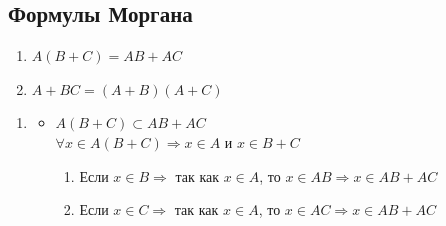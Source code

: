\subsection{Формулы Моргана}
\begin{enumerate}
	\item $A(B+C) = AB + AC$
	\item $A + BC = (A + B)(A + C)$
\end{enumerate}

\begin{tcolorbox}[title=Доказательства]
	\begin{enumerate}
	\item \begin{itemize}
    \item $A(B+C) \subset AB + AC$\\
    $\forall x \in A(B+C) \Rightarrow x \in A \text{ и } x \in B + C$
    \begin{enumerate}
        \item Если $x \in B \Rightarrow$ так как $x \in A$, то $x \in AB \Rightarrow x \in AB + AC$
        \item Если $x \in C \Rightarrow$ так как $x \in A$, то $x \in AC \Rightarrow x \in AB + AC$
    \end{enumerate}
    

\end{itemize}
\end{enumerate}
\end{tcolorbox}
